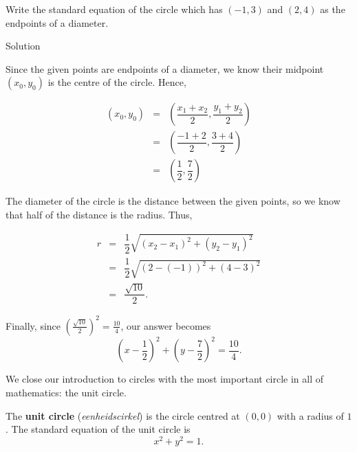 

\ifvc
\begin{example}  Write the standard equation of the circle which has $(-1,3)$ and $(2,4)$ as the endpoints of a diameter.

Solution 

 Since the given points are endpoints of a diameter, we know their midpoint $(x_0, y_0)$ is the centre of the circle.  Hence,

\[ \begin{array}{rcl} (x_0,y_0) &  = & \left( \dfrac{x_1 + x_2}{2},  \dfrac{y_1 + y_2}{2} \right) \\ [8pt]
&  = &  \left( \dfrac{-1+2}{2},  \dfrac{3+4}{2} \right) \\ [8pt]
& = &  \left( \dfrac{1}{2},  \dfrac{7}{2} \right)  \end{array} \]

The diameter of the circle is the distance between the given points, so we know that half of the distance is the radius.  Thus, 

\[ \begin{array}{rcl} r &  = & \dfrac{1}{2} \sqrt{\left(x_2 - x_1\right)^2+\left(y_2-y_1\right)^2}  \\ [8pt]
 &  = & \dfrac{1}{2} \sqrt{(2-(-1))^2+(4-3)^2} \\ [8pt]
 & = &\dfrac{\sqrt{10}}{2}. \end{array} \]

Finally, since $\left( \frac{\sqrt{10}}{2} \right)^2 = \frac{10}{4}$, our answer becomes 
$$\left(x - \dfrac{1}{2} \right)^2 + \left(y - \dfrac{7}{2} \right)^2 =\dfrac{10}{4}.$$ 

\end{example}
\fi

We close our introduction to circles with the most important circle in all of mathematics:  the unit circle.

\begin{definition}

The \textbf{unit circle} (\textit{eenheidscirkel})\label{UnitCircle} is the circle centred at $(0,0)$ with a radius of $1$.  The standard equation of the unit circle is 
$$x^2 + y^2 = 1.$$

\end{definition}

